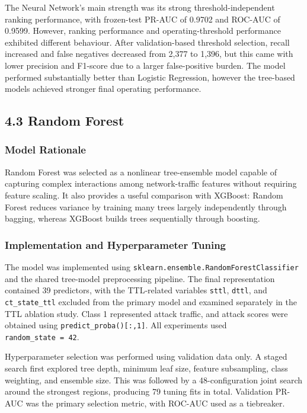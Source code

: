 \documentclass[
  canadian,
  12pt,
]{article}
\let\reportOrigSubsection\subsection
\renewcommand{\subsection}{\par\Needspace*{8\baselineskip}\reportOrigSubsection}%
\let\reportOrigSubsubsection\subsubsection
\renewcommand{\subsubsection}{\par\Needspace*{5\baselineskip}\reportOrigSubsubsection}%
\begin{document}
The Neural Network's main strength was its strong threshold-independent
ranking performance, with frozen-test PR-AUC of 0.9702 and ROC-AUC of
0.9599. However, ranking performance and operating-threshold performance
exhibited different behaviour. After validation-based threshold
selection, recall increased and false negatives decreased from 2,377 to
1,396, but this came with lower precision and F1-score due to a larger
false-positive burden. The model performed substantially better than
Logistic Regression, however the tree-based models achieved stronger
final operating performance.

\subsection[\texorpdfstring{\numberline{4.3}Random Forest}{4.3 Random Forest}]{4.3 Random Forest}\label{sec-4-3}

\subsubsection{Model Rationale}\label{model-rationale-2}

Random Forest was selected as a nonlinear tree-ensemble model capable of
capturing complex interactions among network-traffic features without
requiring feature scaling. It also provides a useful comparison with
XGBoost: Random Forest reduces variance by training many trees largely
independently through bagging, whereas XGBoost builds trees sequentially
through boosting.

\subsubsection{Implementation and Hyperparameter
Tuning}\label{implementation-and-hyperparameter-tuning-2}

The model was implemented using
\texttt{sklearn.\allowbreak{}ensemble.\allowbreak{}RandomForestClassifier} and the shared
tree-model preprocessing pipeline. The final representation contained 39
predictors, with the TTL-related variables \texttt{sttl}, \texttt{dttl},
and \texttt{ct\_state\_ttl} excluded from the primary model and examined
separately in the TTL ablation study. Class 1 represented attack
traffic, and attack scores were obtained using
\texttt{predict\_proba(){[}:,1{]}}. All experiments used
\texttt{random\_state\ =\ 42}.

Hyperparameter selection was performed using validation data only. A
staged search first explored tree depth, minimum leaf size, feature
subsampling, class weighting, and ensemble size. This was followed by a
48-configuration joint search around the strongest regions, producing 79
tuning fits in total. Validation PR-AUC was the primary selection
metric, with ROC-AUC used as a tiebreaker.
\end{document}
